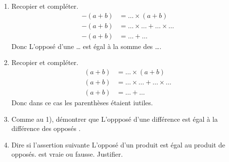 \begin{exercice*}[Démonstrations]
    \begin{enumerate}
        \item Recopier et compléter.
        \begin{align*}
            -(a+b)&= \dots\times(a+b)\\
            -(a+b)&= \dots\times\dots + \dots\times\dots\\
            -(a+b)&= \dots+\dots
        \end{align*}
        Donc \og{} L'opposé d'une \dots{} est égal à la somme des \dots \fg{}.
        \item Recopier et compléter.
        \begin{align*}
            (a+b)&= \dots\times(a+b)\\
            (a+b)&= \dots\times\dots + \dots\times\dots\\
            (a+b)&= \dots+\dots
        \end{align*}
        Donc dans ce cas les parenthèses étaient iutiles.
        \item Comme au 1), démontrer que \og{} L'oppposé d'une différence est égal à la différence des opposés \fg{}.
        \item Dire si l'assertion suivante  \og{} L'opposé d'un produit est égal au produit de opposés.\fg{} est vraie ou fausse. Justifier.
    \end{enumerate}
\end{exercice*}
